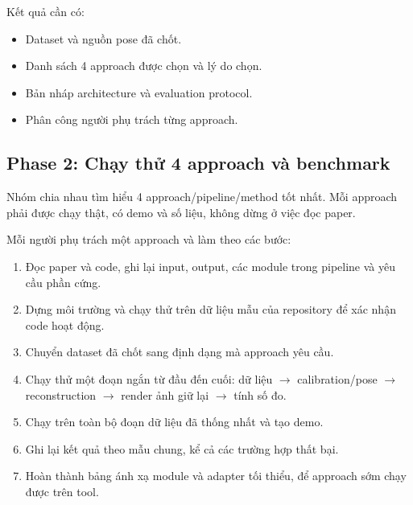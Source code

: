 Kết quả cần có:
\begin{itemize}
  \item Dataset và nguồn pose đã chốt.
  \item Danh sách 4 approach được chọn và lý do chọn.
  \item Bản nháp architecture và evaluation protocol.
  \item Phân công người phụ trách từng approach.
\end{itemize}

\subsection{Phase 2: Chạy thử 4 approach và benchmark}

Nhóm chia nhau tìm hiểu 4 approach/pipeline/method tốt nhất.
Mỗi approach phải được chạy thật, có demo và số liệu, không dừng ở việc đọc paper.

Mỗi người phụ trách một approach và làm theo các bước:
\begin{enumerate}
  \item Đọc paper và code, ghi lại input, output, các module trong pipeline và yêu cầu phần cứng.
  \item Dựng môi trường và chạy thử trên dữ liệu mẫu của repository để xác nhận code hoạt động.
  \item Chuyển dataset đã chốt sang định dạng mà approach yêu cầu.
  \item Chạy thử một đoạn ngắn từ đầu đến cuối: dữ liệu $\to$ calibration/pose $\to$ reconstruction $\to$ render ảnh giữ lại $\to$ tính số đo.
  \item Chạy trên toàn bộ đoạn dữ liệu đã thống nhất và tạo demo.
  \item Ghi lại kết quả theo mẫu chung, kể cả các trường hợp thất bại.
  \item Hoàn thành bảng ánh xạ module và adapter tối thiểu, để approach sớm chạy được trên tool.
\end{enumerate}

